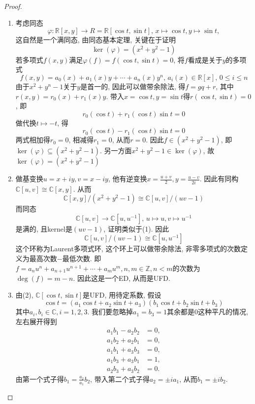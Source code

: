 \documentclass{../solutions-cn}
\begin{document}
\begin{proof}
\begin{enumerate}[(1)]
    \item 考虑同态
    \[
        \varphi: \mathbb{R}[x, y] \to R = \mathbb{R}[\cos t, \sin t],\, x \mapsto \cos t, y \mapsto \sin t,
    \]
    这自然是一个满同态, 由同态基本定理, 关键在于证明
    \[
        \ker(\varphi) = (x^2 + y^2 - 1)
    \]
    若多项式$f(x, y)$满足$\varphi(f) = f(\cos t, \sin t) = 0$, 将$f$看成是关于$y$的多项式
    \[
        f(x, y) = a_0(x) + a_1(x)y + \cdots + a_n(x)y^n,\, a_i(x) \in \mathbb{R}[x],\, 0 \leqslant i \leqslant n
    \]
    由于$x^2 + y^n - 1$关于$y$是首一的, 因此可以做带余除法, 得$f = gq + r$, 其中$r(x, y) = r_0(x) + r_1(x)y$. 带入$x = \cos t, y = \sin t$得$r(\cos t, \sin t) = 0$, 即
    \[
        r_0(\cos t) + r_1(\cos t)\sin t = 0
    \]
    做代换$t \mapsto -t$, 得
    \[
        r_0(\cos t) - r_1(\cos t)\sin t = 0
    \]
    两式相加得$r_0 = 0$, 相减得$r_1 = 0$, 从而$r = 0$. 因此$f \in (x^2 + y^2 - 1)$, 即$\ker(\varphi) \subseteq (x^2 + y^2 - 1)$. 另一方面$x^2 + y^2 - 1 \in \ker(\varphi)$, 故$\ker(\varphi) = (x^2 + y^2 - 1)$
    \item 做基变换$u = x + iy, v = x - iy$, 他有逆变换$x = \frac{u + v}{2}, y = \frac{u - v}{2i}$. 因此有同构$\mathbb{C}[u, v] \cong \mathbb{C}[x, y]$. 从而
    \[
        \mathbb{C}[x, y]/(x^2 + y^2 - 1) \cong \mathbb{C}[u, v]/(uv - 1)
    \]
    而同态
    \[
        \mathbb{C}[u, v] \to \mathbb{C}[u, u^{-1}],\, u \mapsto u, v \mapsto u^{-1}
    \]
    是满的, 且kernel是$(uv - 1)$, 证明类似于(1). 因此
    \[
        \mathbb{C}[u, v]/(uv - 1) \cong \mathbb{C}[u, u^{-1}]
    \]
    这个环称为Laurent多项式环, 这个环上可以做带余除法, 非零多项式的次数定义为最高次数$-$最低次数. 即$f = a_nu^n + a_{n + 1}u^{n + 1} + \cdots + a_mu^m, n, m \in \mathbb{Z}, n < m$的次数为$\deg(f) = m - n$.
    因此这是一个ED, 从而是UFD.
    \item 由(2), $\mathbb{C}[\cos t, \sin t]$是UFD, 用待定系数, 假设
    \[
        \cos t = (a_1\cos t + a_2\sin t + a_3)(b_1\cos t + b_2\sin t + b_3)
    \]
    其中$a_i, b_i \in \mathbb{C}, i = 1, 2, 3$. 我们要忽略掉$a_1 = b_3 = 1$其余都是$0$这种平凡的情况, 左右展开得到
    \[
        \begin{aligned}
            a_1b_1 - a_2b_2 &= 0,\\
            a_1b_2 + a_2b_1 &= 0,\\
            a_1b_1 + a_3b_3 &= 0,\\
            a_1b_3 + a_3b_1 &= 1,\\
            a_2b_3 + a_3b_2 &= 0.
        \end{aligned}
    \]
    由第一个式子得$b_1 = \frac{a_2}{a_1}b_2$, 带入第二个式子得$a_2 = \pm ia_1$, 从而$b_1 = \pm ib_2$.
    

\end{enumerate}
\end{proof}
\end{document}
